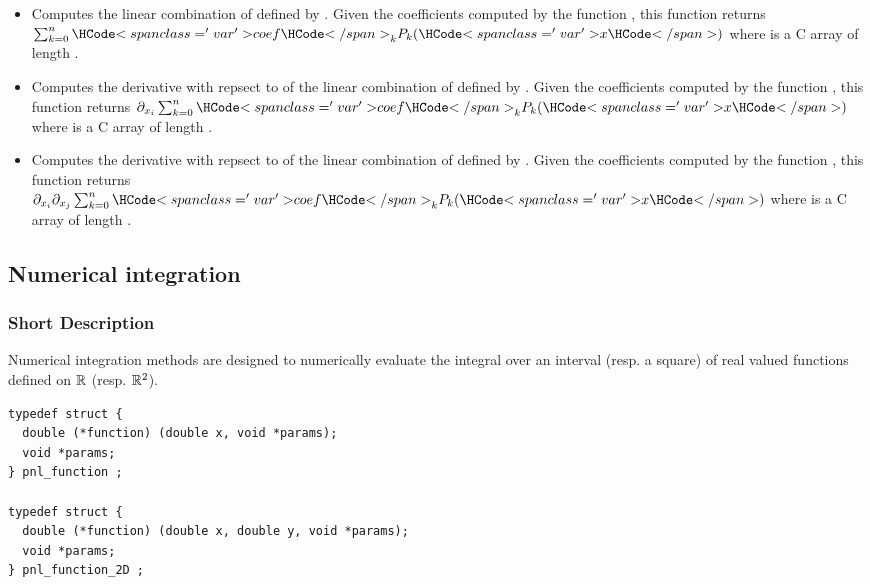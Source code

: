 \begin{itemize}
  \item {}
    \sshortdescribe Computes the linear combination of  defined by
    . Given the coefficients computed by the function
    , this function returns $\sum_{k=0}^n
    \var{coef}_k  P_k(\var{x})$ where  is a C array of length
    .

  \item {}
    \sshortdescribe Computes the derivative with repsect to  of the
    linear combination of  defined by . Given the
    coefficients computed by the function , this
    function returns $\partial_{x_i} \sum_{k=0}^n \var{coef}_k  P_k(\var{x})$
    where  is a C array of length .

  \item {}
    \sshortdescribe Computes the derivative with repsect to  of the
    linear combination of  defined by . Given the
    coefficients computed by the function , this
    function returns $\partial_{x_i} \partial_{x_j} \sum_{k=0}^n \var{coef}_k  P_k(\var{x})$
    where  is a C array of length .
\end{itemize}


\subsection{Numerical integration}
\subsubsection{Short Description}

Numerical integration methods are designed to numerically evaluate the
integral over an interval (resp. a square) of real valued functions defined on
${\mathbb R}$ (resp. ${\mathbb R}^2$).

\begin{verbatim}
typedef struct {
  double (*function) (double x, void *params);
  void *params;
} pnl_function ;

typedef struct {
  double (*function) (double x, double y, void *params);
  void *params;
} pnl_function_2D ;
\end{verbatim}

